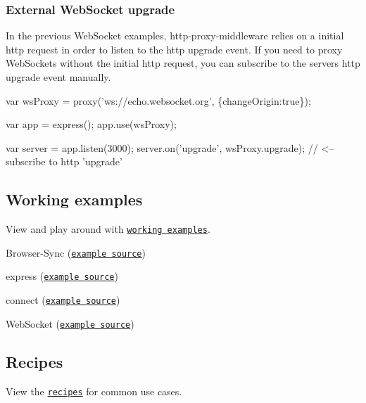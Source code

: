 \subsubsection*{External Web\+Socket upgrade}

In the previous Web\+Socket examples, http-\/proxy-\/middleware relies on a initial http request in order to listen to the http {\ttfamily upgrade} event. If you need to proxy Web\+Sockets without the initial http request, you can subscribe to the server\textquotesingle{}s http {\ttfamily upgrade} event manually. 
\begin{DoxyCode}
var wsProxy = proxy('ws://echo.websocket.org', \{changeOrigin:true\});

var app = express();
    app.use(wsProxy);

var server = app.listen(3000);
    server.on('upgrade', wsProxy.upgrade);  // <-- subscribe to http 'upgrade'
\end{DoxyCode}


\subsection*{Working examples}

View and play around with \href{https://github.com/chimurai/http-proxy-middleware/tree/master/examples}{\tt working examples}.


\begin{DoxyItemize}
\item Browser-\/\+Sync (\href{https://github.com/chimurai/http-proxy-middleware/tree/master/examples/browser-sync/index.js}{\tt example source})
\item express (\href{https://github.com/chimurai/http-proxy-middleware/tree/master/examples/express/index.js}{\tt example source})
\item connect (\href{https://github.com/chimurai/http-proxy-middleware/tree/master/examples/connect/index.js}{\tt example source})
\item Web\+Socket (\href{https://github.com/chimurai/http-proxy-middleware/tree/master/examples/websocket/index.js}{\tt example source})
\end{DoxyItemize}

\subsection*{Recipes}

View the \href{https://github.com/chimurai/http-proxy-middleware/tree/master/recipes}{\tt recipes} for common use cases.

